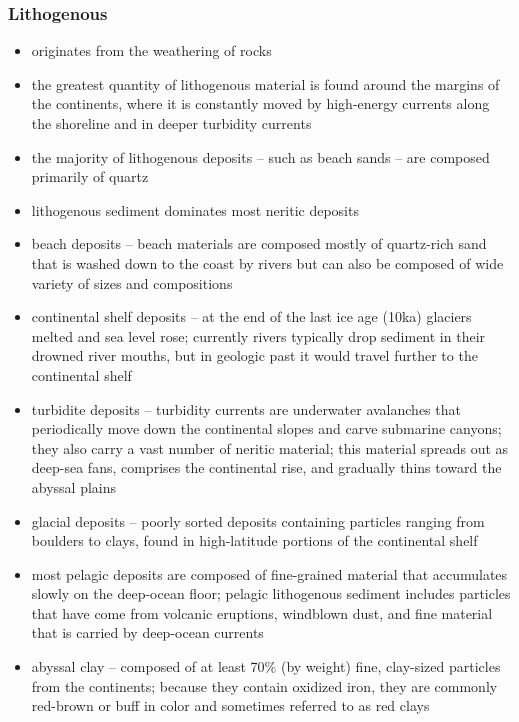 \subsubsection{Lithogenous}
\begin{itemize}
	\item originates from the weathering of rocks
	\item the greatest quantity of lithogenous material is found around
		the margins of the continents, where it is constantly moved by
		high-energy currents along the shoreline and in deeper
		turbidity currents
	\item the majority of lithogenous deposits -- such as  beach sands --
		are composed primarily of quartz
	\item lithogenous sediment dominates most neritic deposits
	\item beach deposits -- beach materials are composed mostly of
		quartz-rich sand that is washed down to the coast by rivers
		but can also be composed of wide variety of sizes and
		compositions
	\item continental shelf deposits -- at the end of the last ice age
		(10ka) glaciers melted and sea level rose; currently rivers
		typically drop sediment in their drowned river mouths, but in
		geologic past it would travel further to the continental shelf
	\item turbidite deposits -- turbidity currents are underwater
		avalanches that periodically move down the continental slopes
		and carve submarine canyons; they also carry a vast number of
		neritic material; this material spreads out as deep-sea fans,
		comprises the continental rise, and gradually thins toward the
		abyssal plains
	\item glacial deposits -- poorly sorted deposits containing particles
		ranging from boulders to clays, found in high-latitude portions
		of the continental shelf
	\item most pelagic deposits are composed of fine-grained material
		that accumulates slowly on the deep-ocean floor; pelagic
		lithogenous sediment includes particles that have come from
		volcanic eruptions, windblown dust, and fine material that is
		carried by deep-ocean currents
	\item abyssal clay -- composed of at least 70\% (by weight) fine,
		clay-sized particles from the continents; because they contain
		oxidized iron, they are commonly red-brown or buff in color
		and sometimes referred to as red clays
\end{itemize}

